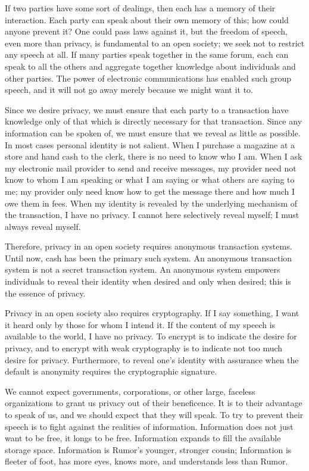 \documentclass[letterpaper,12pt,english]{sphinxmanual}
\begin{document}
If two parties have some sort of dealings, then each has a memory of their interaction. Each party can speak about their own memory of this; how could anyone prevent it? One could pass laws against it, but the freedom of speech, even more than privacy, is fundamental to an open society; we seek not to restrict any speech at all. If many parties speak together in the same forum, each can speak to all the others and aggregate together knowledge about individuals and other parties. The power of electronic communications has enabled such group speech, and it will not go away merely because we might want it to.

Since we desire privacy, we must ensure that each party to a transaction have knowledge only of that which is directly necessary for that transaction. Since any information can be spoken of, we must ensure that we reveal as little as possible. In most cases personal identity is not salient. When I purchase a magazine at a store and hand cash to the clerk, there is no need to know who I am. When I ask my electronic mail provider to send and receive messages, my provider need not know to whom I am speaking or what I am saying or what others are saying to me; my provider only need know how to get the message there and how much I owe them in fees. When my identity is revealed by the underlying mechanism of the transaction, I have no privacy. I cannot here selectively reveal myself; I must always reveal myself.

Therefore, privacy in an open society requires anonymous transaction systems. Until now, cash has been the primary such system. An anonymous transaction system is not a secret transaction system. An anonymous system empowers individuals to reveal their identity when desired and only when desired; this is the essence of privacy.

Privacy in an open society also requires cryptography. If I say something, I want it heard only by those for whom I intend it. If the content of my speech is available to the world, I have no privacy. To encrypt is to indicate the desire for privacy, and to encrypt with weak cryptography is to indicate not too much desire for privacy. Furthermore, to reveal one's identity with assurance when the default is anonymity requires the cryptographic signature.

We cannot expect governments, corporations, or other large, faceless organizations to grant us privacy out of their beneficence. It is to their advantage to speak of us, and we should expect that they will speak. To try to prevent their speech is to fight against the realities of information. Information does not just want to be free, it longs to be free. Information expands to fill the available storage space. Information is Rumor's younger, stronger cousin; Information is fleeter of foot, has more eyes, knows more, and understands less than Rumor.
\end{document}
